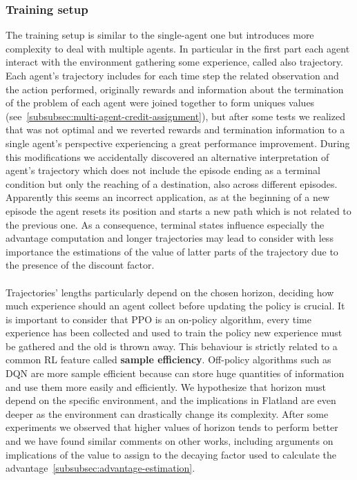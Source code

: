 \documentclass[11pt, a4paper, hidelinks]{report}
\begin{document}
\subsubsection{Training setup}\label{subsubsec:training-setup}

The training setup is similar to the single-agent one but introduces more complexity to deal with multiple agents.
In particular in the first part each agent interact with the environment gathering some experience, called also trajectory.
Each agent's trajectory includes for each time step the related observation and the action performed, originally rewards and information about the termination of the problem of each agent were joined together to form uniques values (see~\ref{subsubsec:multi-agent-credit-assignment}), but after some tests we realized that was not optimal and we reverted rewards and termination information to a single agent's perspective experiencing a great performance improvement.
During this modifications we accidentally discovered an alternative interpretation of agent's trajectory which does not include the episode ending as a terminal condition but only the reaching of a destination, also across different episodes.
Apparently this seems an incorrect application, as at the beginning of a new episode the agent resets its position and starts a new path which is not related to the previous one.
As a consequence, terminal states influence especially the advantage computation and longer trajectories may lead to consider with less importance the estimations of the value of latter parts of the trajectory due to the presence of the discount factor.%
\\
\\
Trajectories' lengths particularly depend on the chosen horizon, deciding how much experience should an agent collect before updating the policy is crucial.
It is important to consider that PPO is an on-policy algorithm, every time experience has been collected and used to train the policy new experience must be gathered and the old is thrown away.
This behaviour is strictly related to a common RL feature called \textbf{sample efficiency}.
Off-policy algorithms such as DQN are more sample efficient because can store huge quantities of information and use them more easily and efficiently.
We hypothesize that horizon must depend on the specific environment, and the implications in Flatland are even deeper as the environment can drastically change its complexity. %
After some experiments we observed that higher values of horizon tends to perform better and we have found similar comments on other works, including arguments on implications of the value to assign to the decaying factor used to calculate the advantage~\ref{subsubsec:advantage-estimation}.\\
\end{document}
